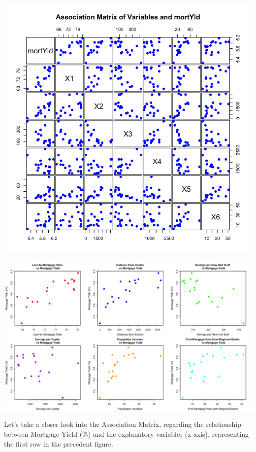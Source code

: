 \documentclass[
  11pt,
]{article}
\begin{document}
\begin{minipage}{0.4\textwidth}
\includegraphics[width=1\linewidth]{association_matrix.png}
\end{minipage}
\hfill
\begin{minipage}{0.6\textwidth}
\includegraphics[width=1\linewidth]{6plots_summary.png}
\end{minipage}

Let's take a closer look into the Association Matrix, regarding the
relationship between Mortgage Yield (\%) and the explanatory variables
(x-axis), representing the first row in the precedent figure.\\
\end{document}
